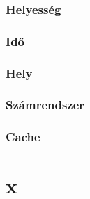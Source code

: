 \documentclass[12pt]{report}
\begin{document}
\subsubsection{Helyesség}

\subsubsection{Idő}

\subsubsection{Hely}

\subsubsection{Számrendszer}

\subsubsection{Cache}

\section{x}
\end{document}
